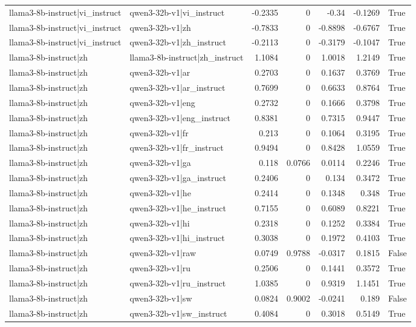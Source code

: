 \begin{table}
\begin{tabular}{l l r r r r l}
llama3-8b-instruct|vi_instruct & qwen3-32b-v1|vi_instruct & -0.2335 & 0 & -0.34 & -0.1269 & True \\
llama3-8b-instruct|vi_instruct & qwen3-32b-v1|zh & -0.7833 & 0 & -0.8898 & -0.6767 & True \\
llama3-8b-instruct|vi_instruct & qwen3-32b-v1|zh_instruct & -0.2113 & 0 & -0.3179 & -0.1047 & True \\
llama3-8b-instruct|zh & llama3-8b-instruct|zh_instruct & 1.1084 & 0 & 1.0018 & 1.2149 & True \\
llama3-8b-instruct|zh & qwen3-32b-v1|ar & 0.2703 & 0 & 0.1637 & 0.3769 & True \\
llama3-8b-instruct|zh & qwen3-32b-v1|ar_instruct & 0.7699 & 0 & 0.6633 & 0.8764 & True \\
llama3-8b-instruct|zh & qwen3-32b-v1|eng & 0.2732 & 0 & 0.1666 & 0.3798 & True \\
llama3-8b-instruct|zh & qwen3-32b-v1|eng_instruct & 0.8381 & 0 & 0.7315 & 0.9447 & True \\
llama3-8b-instruct|zh & qwen3-32b-v1|fr & 0.213 & 0 & 0.1064 & 0.3195 & True \\
llama3-8b-instruct|zh & qwen3-32b-v1|fr_instruct & 0.9494 & 0 & 0.8428 & 1.0559 & True \\
llama3-8b-instruct|zh & qwen3-32b-v1|ga & 0.118 & 0.0766 & 0.0114 & 0.2246 & True \\
llama3-8b-instruct|zh & qwen3-32b-v1|ga_instruct & 0.2406 & 0 & 0.134 & 0.3472 & True \\
llama3-8b-instruct|zh & qwen3-32b-v1|he & 0.2414 & 0 & 0.1348 & 0.348 & True \\
llama3-8b-instruct|zh & qwen3-32b-v1|he_instruct & 0.7155 & 0 & 0.6089 & 0.8221 & True \\
llama3-8b-instruct|zh & qwen3-32b-v1|hi & 0.2318 & 0 & 0.1252 & 0.3384 & True \\
llama3-8b-instruct|zh & qwen3-32b-v1|hi_instruct & 0.3038 & 0 & 0.1972 & 0.4103 & True \\
llama3-8b-instruct|zh & qwen3-32b-v1|raw & 0.0749 & 0.9788 & -0.0317 & 0.1815 & False \\
llama3-8b-instruct|zh & qwen3-32b-v1|ru & 0.2506 & 0 & 0.1441 & 0.3572 & True \\
llama3-8b-instruct|zh & qwen3-32b-v1|ru_instruct & 1.0385 & 0 & 0.9319 & 1.1451 & True \\
llama3-8b-instruct|zh & qwen3-32b-v1|sw & 0.0824 & 0.9002 & -0.0241 & 0.189 & False \\
llama3-8b-instruct|zh & qwen3-32b-v1|sw_instruct & 0.4084 & 0 & 0.3018 & 0.5149 & True \\

\end{tabular}
\end{table}
